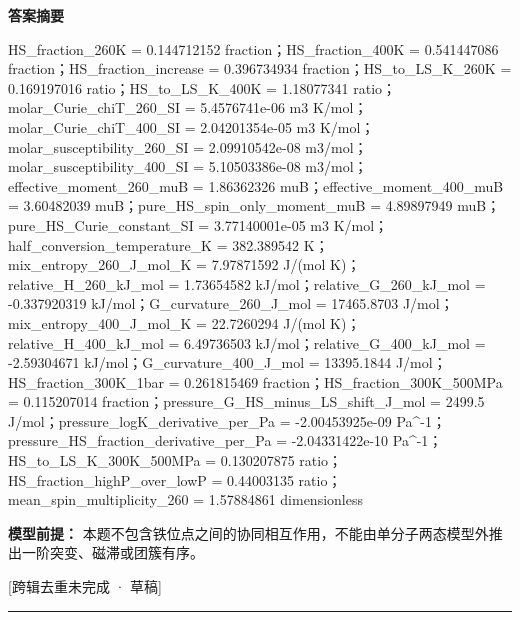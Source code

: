 \documentclass[UTF8,11pt,a4paper]{ctexart}
\begin{document}
\noindent\textbf{答案摘要}\par
HS\_fraction\_260K = 0.144712152 fraction；HS\_fraction\_400K = 0.541447086 fraction；HS\_fraction\_increase = 0.396734934 fraction；HS\_to\_LS\_K\_260K = 0.169197016 ratio；HS\_to\_LS\_K\_400K = 1.18077341 ratio；molar\_Curie\_chiT\_260\_SI = 5.4576741e-06 m3 K/mol；molar\_Curie\_chiT\_400\_SI = 2.04201354e-05 m3 K/mol；molar\_susceptibility\_260\_SI = 2.09910542e-08 m3/mol；molar\_susceptibility\_400\_SI = 5.10503386e-08 m3/mol；effective\_moment\_260\_muB = 1.86362326 muB；effective\_moment\_400\_muB = 3.60482039 muB；pure\_HS\_spin\_only\_moment\_muB = 4.89897949 muB；pure\_HS\_Curie\_constant\_SI = 3.77140001e-05 m3 K/mol；half\_conversion\_temperature\_K = 382.389542 K；mix\_entropy\_260\_J\_mol\_K = 7.97871592 J/(mol K)；relative\_H\_260\_kJ\_mol = 1.73654582 kJ/mol；relative\_G\_260\_kJ\_mol = -0.337920319 kJ/mol；G\_curvature\_260\_J\_mol = 17465.8703 J/mol；mix\_entropy\_400\_J\_mol\_K = 22.7260294 J/(mol K)；relative\_H\_400\_kJ\_mol = 6.49736503 kJ/mol；relative\_G\_400\_kJ\_mol = -2.59304671 kJ/mol；G\_curvature\_400\_J\_mol = 13395.1844 J/mol；HS\_fraction\_300K\_1bar = 0.261815469 fraction；HS\_fraction\_300K\_500MPa = 0.115207014 fraction；pressure\_G\_HS\_minus\_LS\_shift\_J\_mol = 2499.5 J/mol；pressure\_logK\_derivative\_per\_Pa = -2.00453925e-09 Pa\textasciicircum{}-1；pressure\_HS\_fraction\_derivative\_per\_Pa = -2.04331422e-10 Pa\textasciicircum{}-1；HS\_to\_LS\_K\_300K\_500MPa = 0.130207875 ratio；HS\_fraction\_highP\_over\_lowP = 0.44003135 ratio；mean\_spin\_multiplicity\_260 = 1.57884861 dimensionless\par
\noindent\textbf{模型前提：}
本题不包含铁位点之间的协同相互作用，不能由单分子两态模型外推出一阶突变、磁滞或团簇有序。\par
\noindent\textcolor{red!65!black}{[跨辑去重未完成 · 草稿]} \par
\medskip\hrule\medskip
{}
\end{document}
